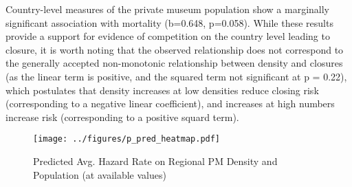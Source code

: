 \documentclass[12pt]{article}
\begin{document}
Country-level measures of the private museum population show a marginally significant association with mortality (b=0.648, p=0.058).
While these results provide a support for evidence of competition on the country level leading to closure, it is worth noting that the observed relationship does not correspond to the generally accepted non-monotonic relationship between density and closures (as the linear term is positive, and the squared term not significant at p = 0.22), which postulates that density increases at low densities reduce closing risk (corresponding to a negative linear coefficient), and increases at high numbers increase risk (corresponding to a positive squard term).


\begin{figure}[htbp]
\centering
\texttt{[image: ../figures/p\_pred\_heatmap.pdf]}
\caption{\label{fig:p_pred_heatmap}Predicted Avg. Hazard Rate on Regional PM Density and Population (at available values)}
\end{figure}
\end{document}
